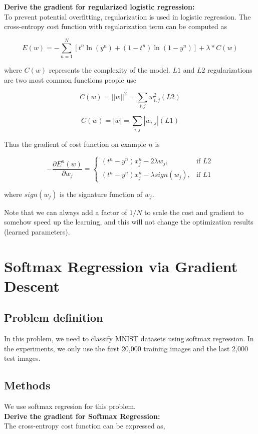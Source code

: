 \documentclass{article} %
\begin{document}
\textbf{Derive the gradient for regularized logistic regression:} \\

To prevent potential overfitting, regularization is used in logistic regression. The cross-entropy cost function with regularization term can be computed as

\begin{equation}
	E(w) = - \sum_{n=1}^{N}[t^{n}\ln(y^{n})+(1-t^{n})\ln(1-y^{n})] + \lambda * C(w)
\end{equation}

where $C(w)$ represents the complexity of the model. $L1$ and $L2$ regularizations are two most common functions people use

\begin{equation}
	C(w) = ||w||^{2} = \sum_{i, j}w_{i, j}^{2}(L2)
\end{equation}

\begin{equation}
	C(w) = |w| = \sum_{i, j}|w_{i, j}|(L1)
\end{equation}

Thus the gradient of cost function on example $n$ is 

\[
    -\frac{\partial E^{n}(w)}{\partial w_{j}} = 
\begin{cases}
    (t^{n}-y^{n})x_{j}^{n} - 2\lambda w_{j},& \text{if } L2\\
    (t^{n}-y^{n})x_{j}^{n} - \lambda sign(w_{j}), & \text{if } L1
\end{cases}
\]

where $sign(w_{j})$ is the signature function of $w_{j}$. 

Note that we can always add a factor of $1/N$ to scale the cost and gradient to somehow speed up the learning, and this will not change the optimization results (learned parameters).


\section{Softmax Regression via Gradient Descent}
\subsection{Problem definition}
In this problem, we need to classify MNIST datasets using softmax regression. In the experiments, we only use the first 20,000 training images and the last 2,000 test images.

\subsection{Methods}
We use softmax regresion for this problem. \\
\textbf{Derive the gradient for Softmax Regression:} \\
The cross-entropy cost function can be expressed as,
\end{document}
